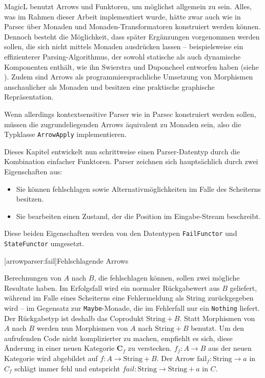 \documentclass[12pt, a4paper, bibgerm]{scrbook}
\newcommand\icode[1]{\lstinline?#1?}
\newcommand\lsection{}
\begin{document}
MagicL benutzt Arrows und Funktoren, um möglichst allgemein zu
sein. Alles, was im Rahmen dieser Arbeit implementiert wurde, hätte zwar
auch wie in Parsec über Monaden und Monaden-Transformatoren konstruiert
werden können. Dennoch besteht die Möglichkeit, dass später Ergänzungen
vorgenommen werden sollen, die sich nicht mittels Monaden ausdrücken
lassen -- beispielsweise ein effizienterer Parsing-Algorithmus, der
sowohl statische als auch dynamische Komponenten enthält, wie ihn
Swierstra und Duponcheel entworfen haben (siehe
\cite[S. 8ff]{Hughes}). Zudem sind Arrows als programmiersprachliche
Umsetzung von Morphismen anschaulicher als Monaden und besitzen eine
praktische graphische Repräsentation.

Wenn allerdings kontextsensitive Parser wie in Parsec konstruiert werden
sollen, müssen die zugrundeliegenden Arrows äquivalent zu Monaden sein,
also die Typklasse \icode{ArrowApply} implementieren.

Dieses Kapitel entwickelt nun schrittweise einen Parser-Datentyp durch
die Kombination einfacher Funktoren. Parser zeichnen sich hauptsächlich
durch zwei Eigenschaften aus:
\begin{itemize}
\item Sie können fehlschlagen sowie Alternativmöglichkeiten im Falle des
  Scheiterns besitzen.
\item Sie bearbeiten einen Zustand, der die Position im Eingabe-Stream
  beschreibt.
\end{itemize}
Diese beiden Eigenschaften werden von den Datentypen \icode{FailFunctor}
und \icode{StateFunctor} umgesetzt.

\lsection[arrowparser:fail]{Fehlschlagende Arrows}

Berechnungen von $A$ nach $B$, die fehlschlagen können, sollen zwei
mögliche Resultate haben. Im Erfolgsfall wird ein normaler Rückgabewert
aus $B$ geliefert, während im Falle eines Scheiterns eine Fehlermeldung
als String zurückgegeben wird -- im Gegensatz zur \icode{Maybe}-Monade,
die im Fehlerfall nur ein \icode{Nothing} liefert. Der Rückgabetyp ist
deshalb das Coprodukt $\mathrm{String}+B$. Statt Morphismen von $A$ nach
$B$ werden nun Morphismen von $A$ nach $\mathrm{String}+B$ benutzt. Um
den aufrufenden Code nicht komplizierter zu machen, empfiehlt es sich,
diese Änderung in einer neuen Kategorie $\mathbf{C}_f$ zu
verstecken. $f_{f} : A \rightarrow B$ aus der neuen Kategorie wird
abgebildet auf $f : A \rightarrow \mathrm{String} + B$. Der Arrow
$\mathrm{fail}_{f} : \mathrm{String} \rightarrow a$ in $C_{f}$ schlägt
immer fehl und entspricht $fail : \mathrm{String} \rightarrow
\mathrm{String} + a$ in $C$.
\end{document}
